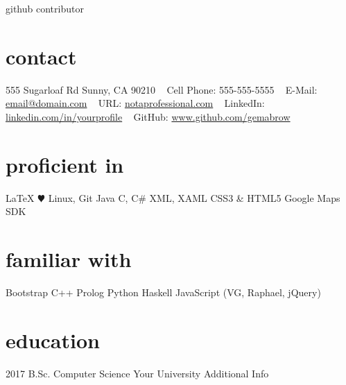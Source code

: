 \documentclass[]{./friggeri-cv}
\begin{document}
       {github contributor}

\begin{aside}
  \section{contact}
    \hspace{-3em}555 Sugarloaf Rd
    Sunny, CA 90210 
    ~
    {Cell Phone: 555-555-5555} 
    ~ 
    E-Mail:
    \href{mailto:email@domain.com}{\hspace{-3em}email@domain.com}
    ~
    URL: \href{http://www.iamprofessional.com}{notaprofessional.com}
    ~ 
    LinkedIn:\hspace{-1em} \href{http://linkedin.com/in/thisguy}{\hspace{-3em}linkedin.com/in/yourprofile}
    ~
    GitHub: \href{http://www.github.com/gemabrow}{\hspace{-3em}www.github.com/gemabrow}
  \section{proficient in}
    \LaTeX
   {\color{red} $\varheartsuit$} %
    Linux, Git
    Java
    C, C\#
    XML, XAML
    CSS3 \& HTML5
    Google Maps SDK
  \section{familiar with}
    Bootstrap 
    C++
    Prolog
    Python
    Haskell
    JavaScript
    (VG, Raphael, jQuery)
\end{aside}
\section{education}
\begin{entrylist}
  \entry
    {2017}
    {B.Sc. {\normalfont Computer Science}}
    {Your University}
    {Additional Info} 
\end{entrylist}
\end{document}
